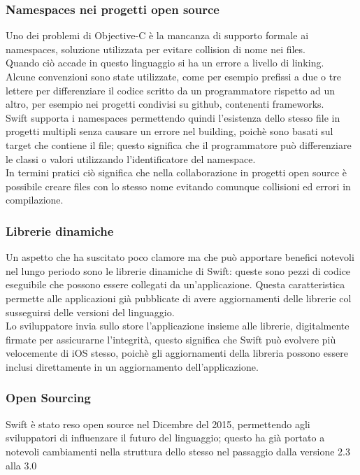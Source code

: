\subsubsection{Namespaces nei progetti open source}
Uno dei problemi di Objective-C è la mancanza di supporto formale ai namespaces, soluzione utilizzata per evitare collision di nome nei files.\\Quando ciò accade in questo linguaggio si ha un errore a livello di linking.\\Alcune convenzioni sono state utilizzate, come per esempio prefissi a due o tre lettere per differenziare il codice scritto da un programmatore rispetto ad un altro, per esempio nei progetti condivisi su github, contenenti frameworks.\\
Swift supporta i namespaces permettendo quindi l'esistenza dello stesso file in progetti multipli senza causare un errore nel building, poichè sono basati sul target che contiene il file; questo significa che il programmatore può differenziare le classi o valori utilizzando l'identificatore del namespace.\\
In termini pratici ciò significa che nella collaborazione in progetti open source è possibile creare files con lo stesso nome evitando comunque collisioni ed errori in compilazione.\\
\subsubsection{Librerie dinamiche}
Un aspetto che ha suscitato poco clamore ma che può apportare benefici notevoli nel lungo periodo sono le librerie dinamiche di Swift: queste sono pezzi di codice eseguibile che possono essere collegati da un'applicazione. Questa caratteristica permette alle applicazioni già pubblicate di avere aggiornamenti delle librerie col susseguirsi delle versioni del linguaggio.\\Lo sviluppatore invia sullo store l'applicazione insieme alle librerie, digitalmente firmate per assicurarne l'integrità, questo significa che Swift può evolvere più velocemente di iOS stesso, poichè gli aggiornamenti della libreria possono essere inclusi direttamente in un aggiornamento dell'applicazione.\\
\subsubsection{Open Sourcing}
Swift è stato reso open source nel Dicembre del 2015, permettendo agli sviluppatori di influenzare il futuro del linguaggio; questo ha già portato a notevoli cambiamenti nella struttura dello stesso nel passaggio dalla versione 2.3 alla 3.0  

